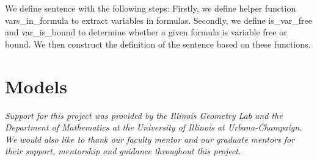 \documentclass[landscape]{sciposter}
\begin{document}
\begin{multicols}{4}
\begin{center}
\begin{figure}
\end{figure}\end{center}

We define sentence with the following steps: Firstly, we define helper function vars\_in\_formula to extract variables in formulas. Secondly, we define is\_var\_free and var\_is\_bound to determine whether a given formula is variable free or bound. We then construct the definition of the sentence based on these functions.
\section*{Models}
\end{multicols}


\vfill
 {}\centerline{\emph{
Support for this project was provided by the Illinois Geometry Lab and the Department of Mathematics at the University of Illinois at Urbana-Champaign. We would also like to thank our faculty mentor and our graduate mentors for their support, mentorship and guidance throughout this project.}}
\end{document}
